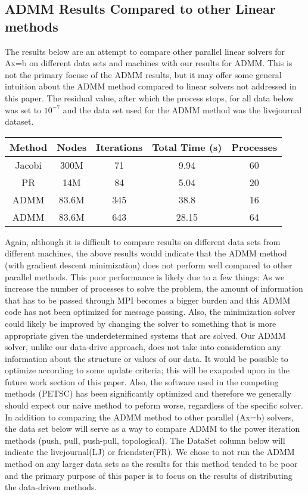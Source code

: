 \documentclass[letterpaper,11pt,onecolumn]{article}
\begin{document}
\subsection{ADMM Results Compared to other Linear methods}
The results below are an attempt to compare other parallel linear solvers for Ax=b  on different data sets and machines with our results for ADMM. This is not the primary focuse of the ADMM results, but it may offer some general intuition about the ADMM method compared to linear solvers not addressed in this paper.
The residual value, after which the process stops, for all data below was set to $10^{-7}$ and the data set used for the ADMM method was the livejournal dataset.
\begin{center}
  \begin{tabular}{c|c|c|c|c}
	\hline
	Method & Nodes & Iterations & Total Time (s) & Processes \\
	\hline\hline
	Jacobi & 300M & 71 & 9.94 & 60\\
	PR & 14M & 84  & 5.04 & 20 \\ 
	ADMM & 83.6M & 345 & 38.8  & 16 \\
	ADMM & 83.6M & 643 & 28.15 & 64 \\
  \end{tabular}
\end{center}

Again, although it is difficult to compare results on different data sets from different machines, the above results would indicate that the ADMM method (with gradient descent minimization) does not perform well compared to other parallel methods. This poor performance is likely due to a few things: As we increase the number of processes to solve the problem, the amount of information that has to be passed through MPI becomes a bigger burden and this ADMM code has not been optimized for message passing. Also, the minimization solver could likely be improved by changing the solver to something that is more appropriate given the underdetermined systems that are solved. Our ADMM solver, unlike our data-drive approach, does not take into consideration any information about the structure or values of our data. It would be possible to optimize according to some update criteria; this will be exapnded upon in the future work section of this paper. Also, the software used in the competing methods (PETSC) has been significantly optimized and therefore we generally should expect our naive method to peform worse, regardless of the specific solver.
\newline
\linebreak
In addition to comparing the ADMM method to other parallel (Ax=b) solvers, the data set below will serve as a way to compare ADMM to the power iteration methods (push, pull, push-pull, topological). The DataSet column below will indicate the livejournal(LJ) or friendster(FR). We chose to not run the ADMM method on any larger data sets as the results for this method tended to be poor and the primary purpose of this paper is to focus on the results of distributing the data-driven methods.
\end{document}
